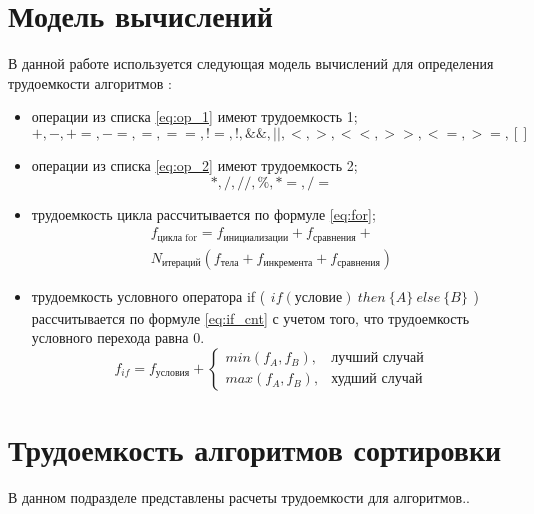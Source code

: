 \documentclass[a4paper,oneside,14pt]{extreport}
\begin{document}
\section{Модель вычислений}
В данной работе используется следующая модель вычислений для определения трудоемкости алгоритмов \cite{ulanov}:
\begin{itemize}
	\item операции из списка \ref{eq:op_1} имеют трудоемкость 1;
	\begin{equation} \label{eq:op_1}
	+, -, +=, -=, =, ==, !=, !, \&\&, ||, <, >, <<, >>, <=, >=, [] 
	\end{equation}
	\item операции из списка \ref{eq:op_2} имеют трудоемкость 2;
	\begin{equation} \label{eq:op_2}
	*, /, //, \%, *=, /=
	\end{equation}
	\item трудоемкость цикла рассчитывается по формуле \ref{eq:for};
	\begin{equation} \label{eq:for}
	\begin{array}{ll}
		f_{\text{цикла for}} = f_{\text{инициализации}} + f_{\text{сравнения}} +\\
		N_{\text{итераций}} (f_{\text{тела}} + f_{\text{инкремента}} + f_{\text{сравнения}})
	\end{array}
	\end{equation}
	\item трудоемкость условного оператора if ($
	\begin{array}{ll}
	if (\text{условие}) \ then \ \{A\}\ else \	 \{B\}  
	\end{array}
	$) рассчитывается по формуле \ref{eq:if_cnt} с учетом того, что трудоемкость условного перехода равна 0. \\
	\begin{equation} \label{eq:if_cnt}
	f_{if} = f_{\text{условия}} +
	\begin{cases}
	min(f_A, f_B), & \textrm{лучший случай}\\
	max(f_A, f_B), & \textrm{худший случай}
	\end{cases}
	\end{equation}
\end{itemize}

\section{Трудоемкость алгоритмов сортировки}
В данном подразделе представлены расчеты трудоемкости для алгоритмов..
\end{document}
